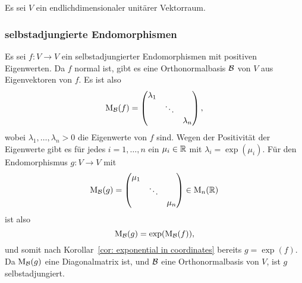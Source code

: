 \documentclass[a4paper, 10pt]{article}
\begin{document}
\subsection{}
Es sei $V$ ein endlichdimensionaler unitärer Vektorraum.


\subsubsection{selbstadjungierte Endomorphismen}
Es sei $f \colon V \to V$ ein selbstadjungierter Endomorphismen mit positiven Eigenwerten.
Da $f$ normal ist, gibt es eine Orthonormalbasis $\mathcal{B}$ von $V$ aus Eigenvektoren von $f$.
Es ist also
\[
  \operatorname{M}_{\mathcal{B}}(f)
  =
  \begin{pmatrix}
    \lambda_1 &         &           \\
              & \ddots  &           \\
              &         & \lambda_n
  \end{pmatrix},
\]
wobei $\lambda_1, \dotsc, \lambda_n > 0$ die Eigenwerte von $f$ sind.
Wegen der Positivität der Eigenwerte gibt es für jedes $i = 1, \dotsc, n$ ein $\mu_i \in \mathbb{R}$ mit $\lambda_i = \exp(\mu_i)$.
Für den Endomorphismus $g \colon V \to V$ mit
\[
  \operatorname{M}_{\mathcal{B}}(g)
  =
  \begin{pmatrix}
    \mu_1 &         &       \\
          & \ddots  &       \\
          &         & \mu_n
  \end{pmatrix}
  \in \operatorname{M}_n(\mathbb{R})
\]
ist also
\[
  \operatorname{M}_{\mathcal{B}}(g) = \exp( \operatorname{M}_{\mathcal{B}}(f) ),
\]
und somit nach Korollar~\ref{cor: exponential in coordinates} bereits $g = \exp(f)$.
Da $\operatorname{M}_{\mathcal{B}}(g)$ eine Diagonalmatrix ist, und $\mathcal{B}$ eine Orthonormalbasis von $V$, ist $g$ selbstadjungiert.
\end{document}
